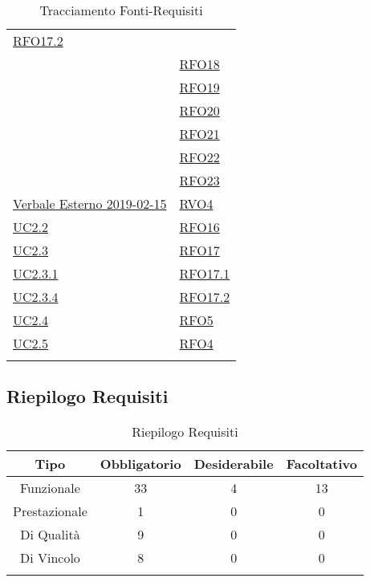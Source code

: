 \begin{longtable}{|>{\centering}m{5cm}|m{5cm}<{\centering}|}
	\hyperlink{RFO17.2}{RFO17.2}\\ & \hyperlink{RFO18}{RFO18}\\ & \hyperlink{RFO19}{RFO19}\\ & \hyperlink{RFO20}{RFO20}\\ & \hyperlink{RFO21}{RFO21}\\ & \hyperlink{RFO22}{RFO22}\\ & \hyperlink{RFO23}{RFO23}\\ \hline
	\hyperlink{Verbale Esterno 2019-02-15}{Verbale Esterno 2019-02-15} &
	\hyperlink{RVO4}{RVO4}\\ \hline
	\hyperref[UC2.2]{UC2.2} & \hyperlink{RFO16}{RFO16}\\ \hline
	\hyperref[UC2.3]{UC2.3} & \hyperlink{RFO17}{RFO17}\\ \hline
	\hyperref[UC2.3.1]{UC2.3.1} & \hyperlink{RFO17.1}{RFO17.1}\\ \hline
	\hyperref[UC2.3.4]{UC2.3.4} & \hyperlink{RFO17.2}{RFO17.2}\\ \hline
	\hyperref[UC2.4]{UC2.4} & \hyperlink{RFO5}{RFO5}\\ \hline
	\hyperref[UC2.5]{UC2.5} & \hyperlink{RFO4}{RFO4}\\ \hline
	\caption[Tracciamento Fonti-Requisiti]{Tracciamento Fonti-Requisiti}
	\label{tabella:fonti-requi}
\end{longtable}
\clearpage

\subsection{Riepilogo Requisiti}
\normalsize
\begin{longtable}{|c|c|c|c|}
	\hline 
	\textbf{Tipo} & \textbf{Obbligatorio} & \textbf{Desiderabile} & \textbf{Facoltativo}\\
	\hline
	Funzionale & 33 & 4 & 13\\ \hline
	Prestazionale & 1 & 0 & 0\\ \hline
	Di Qualità & 9 & 0 & 0\\ \hline
	Di Vincolo & 8 & 0 & 0\\ \hline
	\caption[Riepilogo Requisiti]{Riepilogo Requisiti}
	\label{tabella:riepilogorequi}
\end{longtable}
\clearpage
